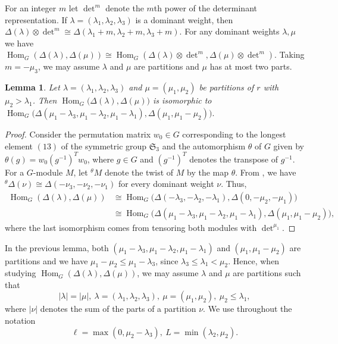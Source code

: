 \documentclass[11pt]{amsart}
\newtheorem{lemma}[theorem]{Lemma}
\theoremstyle{remark}
\theoremstyle{definition}
\newcommand{\Hom}{\operatorname{Hom}}
\newcommand{\D}{\Delta}
\newcommand{\la}{\lambda}
\numberwithin{equation}{section}
\begin{document}
For an integer $m$ let $\det^{m}$ denote the $m$th power of the determinant representation. If $\la =(\la_1, \la_2, \la_3)$ is a dominant weight, then $\D(\la) \otimes \det^{m} \cong \D(\la_1+m, \la_2+m, \la_3+m)$. For any dominant weights $\la, \mu$ we have $\Hom_G(\D(\la), \D(\mu)) \cong \Hom_G(\D(\la) \otimes {\det}^{m}, \D(\mu) \otimes {\det}^{m})$. Taking $m=-\mu_3$, we may assume $\la$ and $\mu$ are partitions and $\mu$ has at most two parts.

	\begin{lemma}\label{lemtwist}
		Let $\la=(\la_1,\la_2,\la_3)$ and
		$\mu=(\mu_1,\mu_2)$ be partitions of $r$ with
		$\mu_2>\la_1$. Then
		$
		\Hom_G\bigl(\Delta(\la),
		\Delta(\mu)\bigr)
	$ is isomorphic to
	$\Hom_G\bigl(\Delta(\mu_1-\la_3,\mu_1-\la_2,
		\mu_1-\la_1),
		\Delta(\mu_1,\mu_1-\mu_2)\bigr).
		$
	\end{lemma}
	\begin{proof}
		Consider the permutation matrix $w_0 \in G$ corresponding to the longest element $(13)$ of the symmetric group $\mathfrak{S}_3$ and the automorphism $\theta$ of $G$ given by $\theta(g)=w_0(g^{-1})^T w_0$, where $g \in G$ and $(g^{-1})^T $ denotes the transpose of $g^{-1}$. For a $G$-module $M$, let ${}^\theta M$ denote the twist of $M$ by the map $\theta$. From \cite[II.2.13, after equation (1)]{Ja}, we have ${}^\theta\D(\nu)\cong\D(-\nu_3,-\nu_2,-\nu_1)$ for every dominant weight $\nu$. Thus, 	\begin{align*}
			\Hom_G(\Delta(\la),\Delta(\mu))
			&\cong
			\Hom_G\bigl(
			\Delta(-\la_3,-\la_2,-\la_1),
			\Delta(0,-\mu_2,-\mu_1)\bigr)\\
			&\cong
			\Hom_G\bigl(
			\Delta(\mu_1-\la_3,\mu_1-\la_2,
			\mu_1-\la_1),
			\Delta(\mu_1,\mu_1-\mu_2)\bigr),
		\end{align*} where the last isomorphism comes from tensoring both modules with ${\det }^{\mu_1}$.
	\end{proof}
In the previous lemma, both $(\mu_1-\la_3,\mu_1-\la_2,
	\mu_1-\la_1)$ and $(\mu_1,\mu_1-\mu_2)$ are partitions and we have $\mu_1-\mu_2 \le \mu_1-\la_3$, since $\la_3\le\la_1<\mu_2$. Hence, when studying $\Hom_G(\D(\la), \D(\mu))$, we may assume $\la$ and $\mu$ are partitions such that \begin{equation}\label{assumptions1} |\la|=|\mu|, \ \la=(\la_1,\la_2,\la_3), \ \mu=(\mu_1, \mu_2), \ \mu_2 \le \la_1,\end{equation} where $|\nu|$ denotes the sum of the parts of a partition $\nu$. We use throughout the notation \begin{equation}\label{assumptions2}\ell=\max(0,\mu_2-\la_3), \ L=\min(\la_2,\mu_2).\end{equation}
\end{document}
